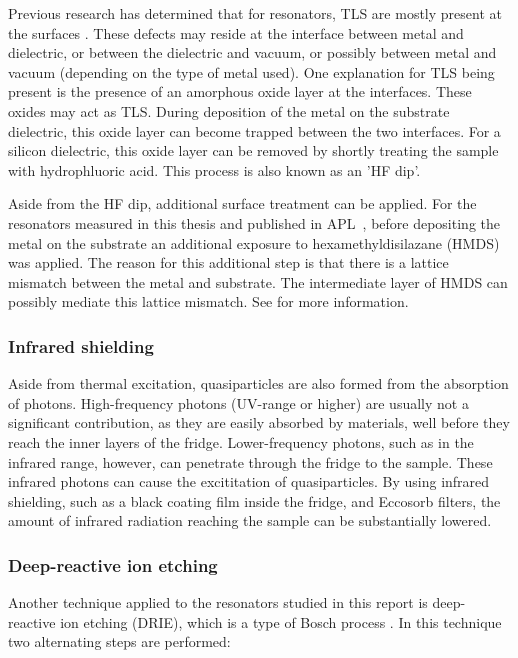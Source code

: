   Previous research has determined that for resonators, TLS are mostly present at the surfaces \cite{gao2008experimental}. These defects may reside at the interface between metal and dielectric, or between the dielectric and vacuum, or possibly between metal and vacuum (depending on the type of metal used). One explanation for TLS being present is the presence of an amorphous oxide layer at the interfaces. These oxides may act as TLS. During deposition of the metal on the substrate dielectric, this oxide layer can become trapped between the two interfaces. For a silicon dielectric, this oxide layer can be removed by shortly treating the sample with hydrophluoric acid. This process is also known as an 'HF dip'.

  Aside from the HF dip, additional surface treatment can be applied. For the resonators measured in this thesis and published in APL~\cite{bruno2015reducing}, before depositing the metal on the substrate an additional exposure to hexamethyldisilazane (HMDS) was applied. The reason for this additional step is that there is a lattice mismatch between the metal and substrate. The intermediate layer of HMDS can possibly mediate this lattice mismatch. See \cite{bruno2015reducing} for more information.


  \subsubsection{Infrared shielding}

  Aside from thermal excitation, quasiparticles are also formed from the absorption of photons. High-frequency photons (UV-range or higher) are usually not a significant contribution, as they are easily absorbed by materials, well before they reach the inner layers of the fridge. Lower-frequency photons, such as in the infrared range, however, can penetrate through the fridge to the sample. These infrared photons can cause the excititation of quasiparticles. By using infrared shielding, such as a black coating film inside the fridge, and Eccosorb filters, the amount of infrared radiation reaching the sample can be substantially lowered.



  \subsubsection{Deep-reactive ion etching}

  Another technique applied to the resonators studied in this report is deep-reactive ion etching (DRIE), which is a type of Bosch process \cite{bruno2015reducing}. In this technique two alternating steps are performed:

